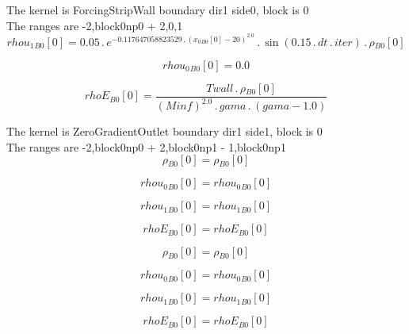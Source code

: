 \documentclass{article}
\begin{document}
\noindent The kernel is ForcingStripWall boundary dir1 side0, block is 0\\\noindent The ranges are -2,block0np0 + 2,0,1\\\begin{dmath}{rhou_{1}{_{B0}}}[{0}] = 0.05 \,.\, e^{- 0.117647058823529 \,.\, \left({x_{0}{_{B0}}}[{0}] - 20 \right)^{2.0}} \,.\, \sin{\left (0.15 \,.\, dt \,.\, iter \right )} \,.\, {\rho{_{B0}}}[{0}]\end{dmath}

\begin{dmath}{rhou_{0}{_{B0}}}[{0}] = 0.0\end{dmath}

\begin{dmath}{rhoE{_{B0}}}[{0}] = \frac{Twall \,.\, {\rho{_{B0}}}[{0}]}{\left(Minf \right)^{2.0} \,.\, gama \,.\, \left(gama - 1.0\right)}\end{dmath}

\noindent The kernel is ZeroGradientOutlet boundary dir1 side1, block is 0\\\noindent The ranges are -2,block0np0 + 2,block0np1 - 1,block0np1\\\begin{dmath}{\rho{_{B0}}}[{0}] = {\rho{_{B0}}}[{0}]\end{dmath}

\begin{dmath}{rhou_{0}{_{B0}}}[{0}] = {rhou_{0}{_{B0}}}[{0}]\end{dmath}

\begin{dmath}{rhou_{1}{_{B0}}}[{0}] = {rhou_{1}{_{B0}}}[{0}]\end{dmath}

\begin{dmath}{rhoE{_{B0}}}[{0}] = {rhoE{_{B0}}}[{0}]\end{dmath}

\begin{dmath}{\rho{_{B0}}}[{0}] = {\rho{_{B0}}}[{0}]\end{dmath}

\begin{dmath}{rhou_{0}{_{B0}}}[{0}] = {rhou_{0}{_{B0}}}[{0}]\end{dmath}

\begin{dmath}{rhou_{1}{_{B0}}}[{0}] = {rhou_{1}{_{B0}}}[{0}]\end{dmath}

\begin{dmath}{rhoE{_{B0}}}[{0}] = {rhoE{_{B0}}}[{0}]\end{dmath}
\end{document}

